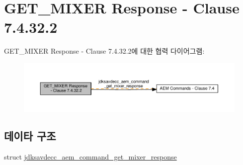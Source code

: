 \hypertarget{group__command__get__mixer__response}{}\section{G\+E\+T\+\_\+\+M\+I\+X\+ER Response -\/ Clause 7.4.32.2}
\label{group__command__get__mixer__response}
G\+E\+T\+\_\+\+M\+I\+X\+ER Response -\/ Clause 7.4.32.2에 대한 협력 다이어그램\+:
\nopagebreak
\begin{figure}[H]
\begin{center}
\leavevmode
\includegraphics[width=350pt]{group__command__get__mixer__response}
\end{center}
\end{figure}
\subsection*{데이타 구조}
\begin{DoxyCompactItemize}
\item 
struct \hyperlink{structjdksavdecc__aem__command__get__mixer__response}{jdksavdecc\+\_\+aem\+\_\+command\+\_\+get\+\_\+mixer\+\_\+response}
\end{DoxyCompactItemize}

